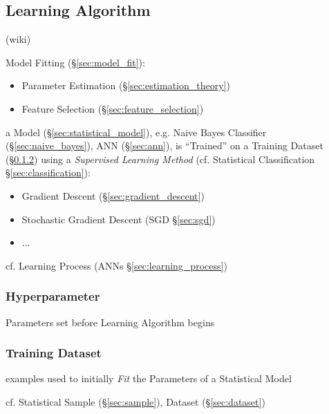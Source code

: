 \subsection{Learning Algorithm}\label{sec:learning_algorithm}

(wiki)

Model Fitting (\S\ref{sec:model_fit}):
\begin{itemize}
  \item Parameter Estimation (\S\ref{sec:estimation_theory})
  \item Feature Selection (\S\ref{sec:feature_selection})
\end{itemize}

a Model (\S\ref{sec:statistical_model}), e.g. Naive Bayes Classifier
(\S\ref{sec:naive_bayes}), ANN (\S\ref{sec:ann}), is ``Trained'' on a Training
Dataset (\S\ref{sec:training_dataset}) using a \emph{Supervised Learning Method}
(cf. Statistical Classification \S\ref{sec:classification}):
\begin{itemize}
  \item Gradient Descent (\S\ref{sec:gradient_descent})
  \item Stochastic Gradient Descent (SGD \S\ref{sec:sgd})
  \item ...
\end{itemize}

\fist cf. Learning Process (ANNs \S\ref{sec:learning_process})



\subsubsection{Hyperparameter}\label{sec:hyperparameter}

Parameters set before Learning Algorithm begins



\subsubsection{Training Dataset}\label{sec:training_dataset}

examples used to initially \emph{Fit} the Parameters of a Statistical Model

cf. Statistical Sample (\S\ref{sec:sample}), Dataset (\S\ref{sec:dataset})



